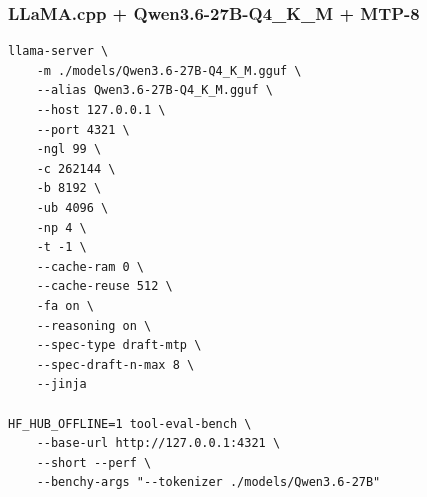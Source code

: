 \documentclass{article}
\begin{document}
\subsubsection{LLaMA.cpp + Qwen3.6-27B-Q4\_K\_M + MTP-8}
\begin{lstlisting}
llama-server \
    -m ./models/Qwen3.6-27B-Q4_K_M.gguf \
    --alias Qwen3.6-27B-Q4_K_M.gguf \
    --host 127.0.0.1 \
    --port 4321 \
    -ngl 99 \
    -c 262144 \
    -b 8192 \
    -ub 4096 \
    -np 4 \
    -t -1 \
    --cache-ram 0 \
    --cache-reuse 512 \
    -fa on \
    --reasoning on \
    --spec-type draft-mtp \
    --spec-draft-n-max 8 \
    --jinja

HF_HUB_OFFLINE=1 tool-eval-bench \
    --base-url http://127.0.0.1:4321 \
    --short --perf \
    --benchy-args "--tokenizer ./models/Qwen3.6-27B"
\end{lstlisting}
\end{document}
